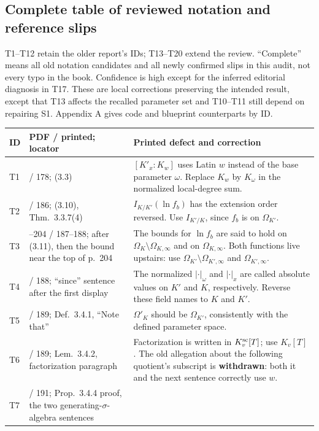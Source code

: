 \documentclass[11pt,a4paper]{article}
\begin{document}
\subsection{Complete table of reviewed notation and reference slips}\label{notation}
T1--T12 retain the older report's IDs; T13--T20 extend the review. “Complete” means all old notation candidates and all newly confirmed slips in this audit, not every typo in the book. Confidence is high except for the inferred editorial diagnosis in T17. These are local corrections preserving the intended result, except that T13 affects the recalled parameter set and T10--T11 still depend on repairing S1. Appendix A gives code and blueprint counterparts by ID.

\small
\begin{longtable}{@{}p{9mm}>{\raggedright\arraybackslash}p{29mm}>{\raggedright\arraybackslash}p{\dimexpr\linewidth-38mm-4\tabcolsep\relax}@{}}
\toprule ID & PDF / printed; locator & Printed defect and correction\\\midrule\endhead
T1 & 194 / 178; (3.3) &
$[K'_x:K_w]$ uses Latin $w$ instead of the base parameter $\omega$. Replace $K_w$ by $K_\omega$ in the normalized local-degree sum.\\[4pt]
T2 & 202 / 186; (3.10), Thm.~3.3.7(4) &
$I_{K/K'}(\ln f_b)$ has the extension order reversed. Use $I_{K'/K}$, since $f_b$ is on $\Omega_{K'}$.\\[4pt]
T3 & 203--204 / 187--188; after (3.11), then the bound near the top of p.~204 &
The bounds for $\ln f_b$ are said to hold on $\Omega_K\setminus\Omega_{K,\infty}$ and on $\Omega_{K,\infty}$. Both functions live upstairs: use $\Omega_{K'}\setminus\Omega_{K',\infty}$ and $\Omega_{K',\infty}$.\\[4pt]
T4 & 204 / 188; “since” sentence after the first display &
The normalized $|\cdot|_\omega$ and $|\cdot|_x$ are called absolute values on $K'$ and $K$, respectively. Reverse these field names to $K$ and $K'$.\\[4pt]
T5 & 205 / 189; Def.~3.4.1, “Note that” &
$\Omega'_K$ should be $\Omega_{K'}$, consistently with the defined parameter space.\\[4pt]
T6 & 205 / 189; Lem.~3.4.2, factorization paragraph &
Factorization is written in $K_v^{\rm sc}[T]$; use $K_v[T]$. The old allegation about the following quotient's subscript is \textbf{withdrawn}: both it and the next sentence correctly use $w$.\\[4pt]
T7 & 207 / 191; Prop.~3.4.4 proof, the two generating-$\sigma$-algebra sentences &

\end{longtable}
\end{document}
